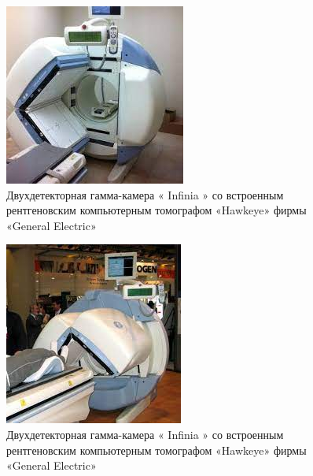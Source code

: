 \documentclass[11pt]{article}
\begin{document}
	\begin{figure}[H]
	\centering
	\includegraphics[width=\textwidth]{gk1}
	\caption{ Двухдетекторная гамма-камера « Infinia » со встроенным рентгеновским компьютерным томографом «Hawkeye» фирмы «General Electric» }
	\label{fig:gk1}
	\end{figure} 

	\begin{figure}[H]
	\centering
	\includegraphics[width=\textwidth]{gk2}
	\caption{ Двухдетекторная гамма-камера « Infinia » со встроенным рентгеновским компьютерным томографом «Hawkeye» фирмы «General Electric» }
	\label{fig:gk2}
	\end{figure} 
	
\end{document}
